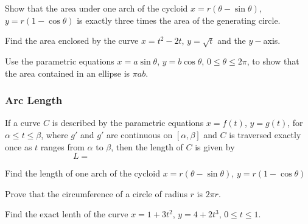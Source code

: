 \documentclass[notes]{subfiles}
\begin{document}
		\begin{ex}
			Show that the area under one arch of the cycloid $x = r(\theta - \sin\theta)$, $y = r(1-\cos \theta)$ is exactly three times the area of the generating circle.
		\end{ex}
			\newpage
			
		\begin{ex}
			Find the area enclosed by the curve $x = t^2-2t$, $y = \sqrt{t}$ and the $y-$axis.
		\end{ex}
			
		\begin{ex}
			Use the parametric equations $x = a\sin\theta$, $y = b\cos\theta$, $0\leq \theta \leq 2\pi$, to show that the area contained in an ellipse is $\pi ab$.
		\end{ex}
			
	\subsubsection*{Arc Length}
		\begin{rmk}
			If a curve $C$ is described by the parametric equations $x = f(t)$, $y = g(t)$, for $\alpha \leq t\leq \beta$, where $g'$ and $g'$ are continuous on $[\alpha,\beta]$ and $C$ is traversed exactly once as $t$ ranges from $\alpha$ to $\beta$, then the length of $C$ is given by\\
			\[L = \hspace{3in}\]	
		\end{rmk}
			\newpage
			
		\begin{pf}
		
		\end{pf}
			\vspace{2in}
		
		\begin{ex}
			Find the length of one arch of the cycloid $x = r(\theta - \sin\theta)$, $y = r(1-\cos\theta)$
		\end{ex}
			
		\begin{ex}
			Prove that the circumference of a circle of radius $r$ is $2\pi r$.
		\end{ex}
			\newpage
			
		\begin{ex}
			Find the exact lenth of the curve $x =1+3t^2$, $y = 4+2t^3$, $0\leq t\leq 1$.
		\end{ex}
			
\end{document}
